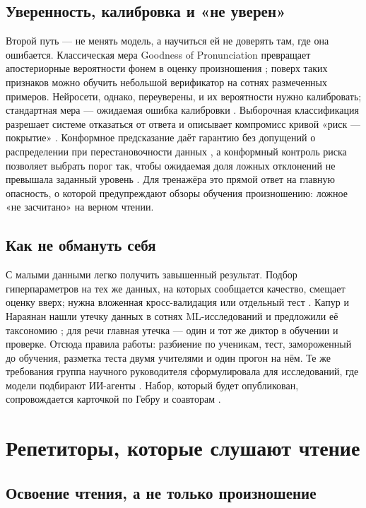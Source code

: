 \documentclass[a4paper,14pt]{extarticle}
\begin{document}
\subsection{Уверенность, калибровка и «не уверен»}

Второй путь --- не менять модель, а научиться ей не доверять там, где она ошибается. Классическая мера
Goodness of Pronunciation превращает апостериорные вероятности фонем в оценку произношения
\cite{SRC-115}; поверх таких признаков можно обучить небольшой верификатор на сотнях размеченных примеров.
Нейросети, однако, переуверены, и их вероятности нужно калибровать; стандартная мера --- ожидаемая ошибка
калибровки \cite{SRC-112}. Выборочная классификация разрешает системе отказаться от ответа и описывает
компромисс кривой «риск --- покрытие» \cite{SRC-117}. Конформное предсказание даёт гарантию без допущений
о распределении при перестановочности данных \cite{SRC-113}, а конформный контроль риска позволяет
выбрать порог так, чтобы ожидаемая доля ложных отклонений не превышала заданный уровень \cite{SRC-114}.
Для тренажёра это прямой ответ на главную опасность, о которой предупреждают обзоры обучения
произношению: ложное «не засчитано» на верном чтении.

\subsection{Как не обмануть себя}

С малыми данными легко получить завышенный результат. Подбор гиперпараметров на тех же данных, на которых
сообщается качество, смещает оценку вверх; нужна вложенная кросс-валидация или отдельный тест
\cite{SRC-121}. Капур и Нараянан нашли утечку данных в сотнях ML-исследований и предложили её таксономию
\cite{SRC-122}; для речи главная утечка --- один и тот же диктор в обучении и проверке. Отсюда правила
работы: разбиение по ученикам, тест, замороженный до обучения, разметка теста двумя учителями и один прогон на нём.
Те же требования группа научного руководителя сформулировала для исследований, где модели подбирают
ИИ-агенты \cite{SRC-067}. Набор, который будет опубликован, сопровождается карточкой по Гебру и
соавторам \cite{SRC-123}.

\section{Репетиторы, которые слушают чтение}

\subsection{Освоение чтения, а не только произношение}
\end{document}
